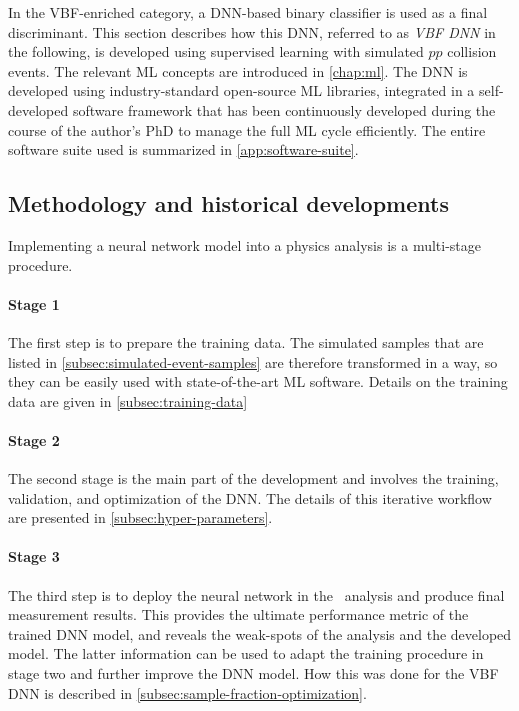 In the VBF-enriched \TwoJet category, a DNN-based binary classifier is used as a final discriminant.
This section describes how this DNN, referred to as \emph{VBF DNN} in the following, is developed using supervised learning with simulated $pp$ collision events.
The relevant ML concepts are introduced in \cref{chap:ml}.
The DNN is developed using industry-standard open-source ML libraries, integrated in a self-developed software framework that has been continuously developed during the course of the author's PhD to manage the full ML cycle efficiently. The entire software suite used is summarized in \cref{app:software-suite}.

\subsection{Methodology and historical developments}
Implementing a neural network model into a physics analysis is a multi-stage procedure. 

\paragraph{Stage 1}
The first step is to prepare the training data.
The simulated samples that are listed in \cref{subsec:simulated-event-samples} are therefore transformed in a way, so they can be easily used with state-of-the-art ML software. Details on the training data are given in \cref{subsec:training-data}

\paragraph{Stage 2}
The second stage is the main part of the development and involves the training, validation, and optimization of the DNN. The details of this iterative workflow are presented in \cref{subsec:hyper-parameters}.

\paragraph{Stage 3}
The third step is to deploy the neural network in the \HWW\ analysis and produce final measurement results. This provides the ultimate performance metric of the trained DNN model, and reveals the weak-spots of the analysis and the developed model. The latter information can be used to adapt the training procedure in stage two and further improve the DNN model. 
How this was done for the VBF DNN is described in \cref{subsec:sample-fraction-optimization}.

